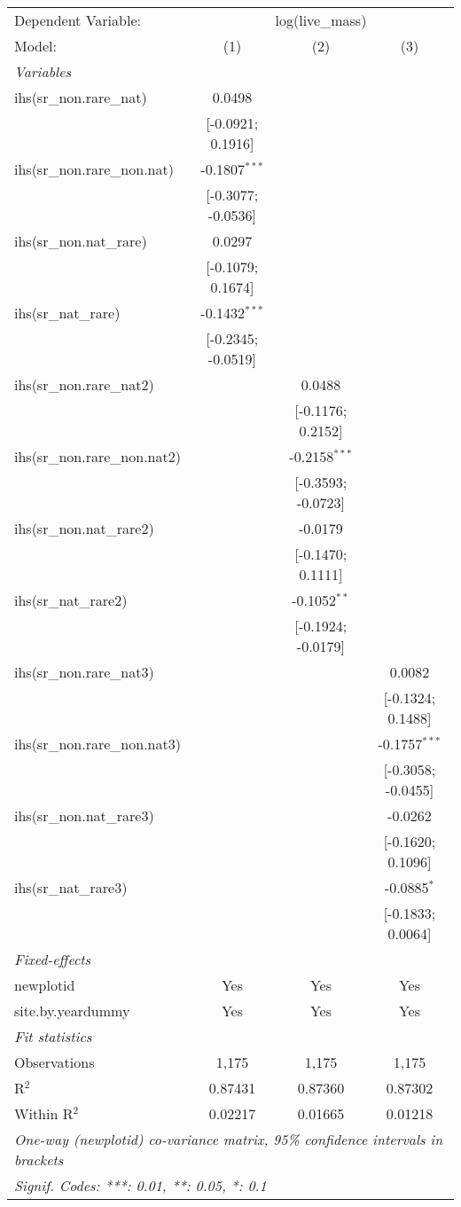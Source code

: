 \begin{tabular}{lccc}
\tabularnewline\midrule\midrule
Dependent Variable:&\multicolumn{3}{c}{log(live\_mass)}\\
Model:&(1) & (2) & (3)\\
\midrule \emph{Variables}&   &   &  \\
ihs(sr\_non.rare\_nat)&0.0498 &    &   \\
  &[-0.0921; 0.1916] &    &   \\
ihs(sr\_non.rare\_non.nat)&-0.1807$^{***}$ &    &   \\
  &[-0.3077; -0.0536] &    &   \\
ihs(sr\_non.nat\_rare)&0.0297 &    &   \\
  &[-0.1079; 0.1674] &    &   \\
ihs(sr\_nat\_rare)&-0.1432$^{***}$ &    &   \\
  &[-0.2345; -0.0519] &    &   \\
ihs(sr\_non.rare\_nat2)&   & 0.0488 &   \\
  &   & [-0.1176; 0.2152] &   \\
ihs(sr\_non.rare\_non.nat2)&   & -0.2158$^{***}$ &   \\
  &   & [-0.3593; -0.0723] &   \\
ihs(sr\_non.nat\_rare2)&   & -0.0179 &   \\
  &   & [-0.1470; 0.1111] &   \\
ihs(sr\_nat\_rare2)&   & -0.1052$^{**}$ &   \\
  &   & [-0.1924; -0.0179] &   \\
ihs(sr\_non.rare\_nat3)&   &    & 0.0082\\
  &   &    & [-0.1324; 0.1488]\\
ihs(sr\_non.rare\_non.nat3)&   &    & -0.1757$^{***}$\\
  &   &    & [-0.3058; -0.0455]\\
ihs(sr\_non.nat\_rare3)&   &    & -0.0262\\
  &   &    & [-0.1620; 0.1096]\\
ihs(sr\_nat\_rare3)&   &    & -0.0885$^{*}$\\
  &   &    & [-0.1833; 0.0064]\\
\midrule \emph{Fixed-effects}&   &   &  \\
newplotid & Yes & Yes & Yes\\
site.by.yeardummy & Yes & Yes & Yes\\
\midrule \emph{Fit statistics}&  & & \\
Observations & 1,175&1,175&1,175\\
R$^2$ & 0.87431&0.87360&0.87302\\
Within R$^2$ & 0.02217&0.01665&0.01218\\
\midrule\midrule\multicolumn{4}{l}{\emph{One-way (newplotid) co-variance matrix, 95\% confidence intervals in brackets}}\\
\multicolumn{4}{l}{\emph{Signif. Codes: ***: 0.01, **: 0.05, *: 0.1}}\\
\end{tabular}


